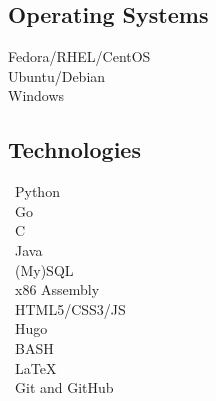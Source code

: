 \documentclass{article}
\begin{document}
\begin{paracol}{2}
    \begin{tcolorbox}
        \subsection*{Operating Systems}
        \textcolor[HTML]{EE0000}{\faRedhat} Fedora/RHEL/CentOS \\
        \textcolor[HTML]{E95420}{\faUbuntu} Ubuntu/Debian \\
        \textcolor[HTML]{0078D6}{\faWindows} Windows
    \end{tcolorbox}

    \begin{tcolorbox}
        \subsection*{Technologies}
        \faPython \ Python \\
        \faGoogle \ Go \\
        \faFileCode \ C \\
        \faJava \ Java \\
        \faDatabase \ (My)SQL \\
        \faMicrochip \ x86 Assembly \\
        \faCode \ HTML5/CSS3/JS \\
        \faGlobe \ Hugo \\
        \faTerminal \ BASH \\
        \faFilePdf \ LaTeX \\
        \faGithub \ Git and GitHub
    \end{tcolorbox}

    \vspace{60pt}

    \begin{center}
        \hypersetup{urlcolor=black}
    \end{center}
\end{paracol}
\end{document}
